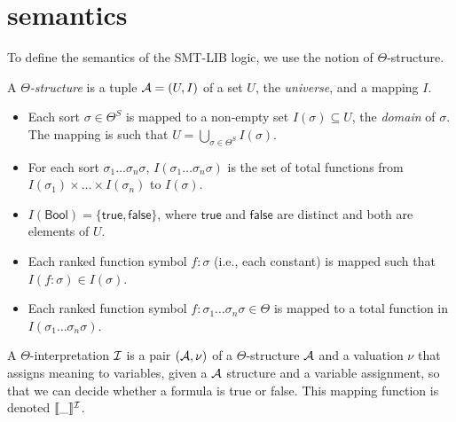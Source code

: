 \section{semantics}

To define the semantics of the SMT-LIB logic, we use the notion of $\Theta$-structure.

\begin{definition} A \emph{$\Theta$-structure} is a tuple $\cal{A} = (U, I)$ of a set $U$, the \emph{universe}, and a mapping $I$.
\begin{itemize}
    \item Each sort $\sigma \in \Theta^{S}$ is mapped to a non-empty set $I(\sigma) \subseteq U$, the \emph{domain} of $\sigma$.  
    The mapping is such that $U = \bigcup_{\sigma \in \Theta^{S}} I(\sigma)$.
    \item For each sort $\sigma_1 \dots \sigma_n \sigma$, $I(\sigma_1 \dots \sigma_n \sigma)$ is the set of total functions from $I(\sigma_1) \times \dots \times I(\sigma_n)$ to $I(\sigma)$.
    \item $I(\mathsf{Bool}) = \{\mathsf{true}, \mathsf{false}\}$, where $\mathsf{true}$ and $\mathsf{false}$ are distinct and both are elements of $U$.
    \item Each ranked function symbol $f : \sigma$ (i.e., each constant) is mapped such that $I(f : \sigma) \in I(\sigma)$.
    \item Each ranked function symbol $f : \sigma_1 \dots \sigma_n \sigma \in \Theta$ is mapped to a total function in $I(\sigma_1 \dots \sigma_n \sigma)$.
\end{itemize}
\end{definition}



A $\Theta$-interpretation $\cal{I}$ is a pair $(\cal{A}, \nu)$ of a $\Theta$-structure $\cal{A}$ and a valuation $\nu$
that assigns meaning to variables, given a $\cal{A}$ structure and a variable assignment, so that we can decide whether a formula is true or false.
This mapping  function is denoted $\llbracket \_ \rrbracket^{\cal{I}}$.


